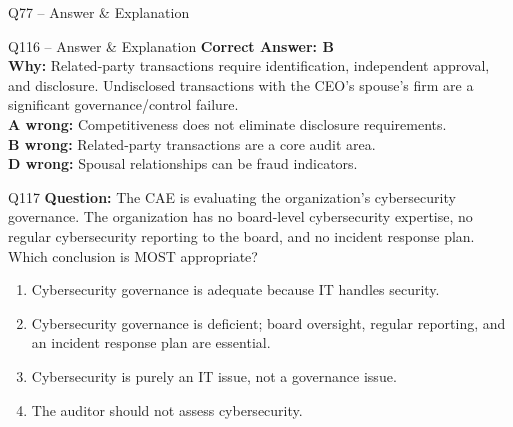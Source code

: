 \documentclass[aspectratio=169,10pt]{beamer}
\begin{document}
\begin{frame}[t]{Q77 -- Answer \& Explanation}
\begin{frame}[t]{Q116 -- Answer \& Explanation}
	\small
	\textbf{Correct Answer: B} \\[4pt]
	\textbf{Why:} Related-party transactions require identification, independent approval, and disclosure. Undisclosed transactions with the CEO's spouse's firm are a significant governance/control failure. \\[4pt]
	\textbf{A wrong:} Competitiveness does not eliminate disclosure requirements. \\[2pt]
	\textbf{B wrong:} Related-party transactions are a core audit area. \\[2pt]
	\textbf{D wrong:} Spousal relationships can be fraud indicators.
\end{frame}

\begin{frame}[t]{Q117}
	\small
	\textbf{Question:} The CAE is evaluating the organization's cybersecurity governance. The organization has no board-level cybersecurity expertise, no regular cybersecurity reporting to the board, and no incident response plan. Which conclusion is MOST appropriate?
	\begin{enumerate}[label=\Alph*.,itemsep=1pt,topsep=2pt]
		\item Cybersecurity governance is adequate because IT handles security.
		\item Cybersecurity governance is deficient; board oversight, regular reporting, and an incident response plan are essential.
		\item Cybersecurity is purely an IT issue, not a governance issue.
		\item The auditor should not assess cybersecurity.
	\end{enumerate}
\end{frame}


\end{frame}
\end{document}
